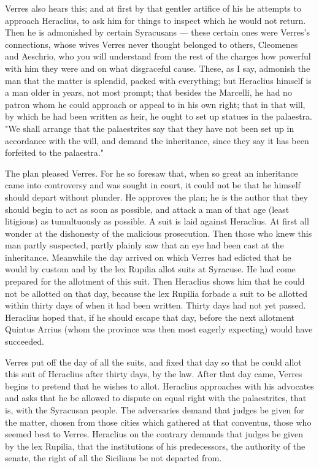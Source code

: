  Verres also hears this; and at first by that gentler artifice of his he attempts to approach Heraclius, to ask him for things to inspect which he would not return. Then he is admonished by certain Syracusans --- these certain ones were Verres's connections, whose wives Verres never thought belonged to others, Cleomenes and Aeschrio, who you will understand from the rest of the charges how powerful with him they were and on what disgraceful cause. These, as I say, admonish the man that the matter is splendid, packed with everything; but Heraclius himself is a man older in years, not most prompt; that besides the Marcelli, he had no patron whom he could approach or appeal to in his own right; that in that will, by which he had been written as heir, he ought to set up statues in the palaestra. "We shall arrange that the palaestrites say that they have not been set up in accordance with the will, and demand the inheritance, since they say it has been forfeited to the palaestra."

 The plan pleased Verres. For he so foresaw that, when so great an inheritance came into controversy and was sought in court, it could not be that he himself should depart without plunder. He approves the plan; he is the author that they should begin to act as soon as possible, and attack a man of that age (least litigious) as tumultuously as possible. A suit is laid against Heraclius. At first all wonder at the dishonesty of the malicious prosecution. Then those who knew this man partly suspected, partly plainly saw that an eye had been cast at the inheritance. Meanwhile the day arrived on which Verres had edicted that he would by custom and by the lex Rupilia allot suits at Syracuse. He had come prepared for the allotment of this suit. Then Heraclius shows him that he could not be allotted on that day, because the lex Rupilia forbade a suit to be allotted within thirty days of when it had been written. Thirty days had not yet passed. Heraclius hoped that, if he should escape that day, before the next allotment Quintus Arrius (whom the province was then most eagerly expecting) would have succeeded.

 Verres put off the day of all the suits, and fixed that day so that he could allot this suit of Heraclius after thirty days, by the law. After that day came, Verres begins to pretend that he wishes to allot. Heraclius approaches with his advocates and asks that he be allowed to dispute on equal right with the palaestrites, that is, with the Syracusan people. The adversaries demand that judges be given for the matter, chosen from those cities which gathered at that conventus, those who seemed best to Verres. Heraclius on the contrary demands that judges be given by the lex Rupilia, that the institutions of his predecessors, the authority of the senate, the right of all the Sicilians be not departed from.

